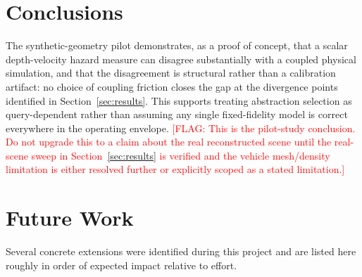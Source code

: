 \documentclass[conference]{IEEEtran}
\newcommand{\FLAG}[1]{\textcolor{red}{[FLAG: #1]}}
\begin{document}
\section{Conclusions}
\label{sec:conclusions}

The synthetic-geometry pilot demonstrates, as a proof of concept, that a scalar depth-velocity hazard measure can disagree substantially with a coupled physical simulation, and that the disagreement is structural rather than a calibration artifact: no choice of coupling friction closes the gap at the divergence points identified in Section~\ref{sec:results}. This supports treating abstraction selection as query-dependent rather than assuming any single fixed-fidelity model is correct everywhere in the operating envelope. \FLAG{This is the pilot-study conclusion. Do not upgrade this to a claim about the real reconstructed scene until the real-scene sweep in Section~\ref{sec:results} is verified and the vehicle mesh/density limitation is either resolved further or explicitly scoped as a stated limitation.}

\section{Future Work}
\label{sec:future}

Several concrete extensions were identified during this project and are listed here roughly in order of expected impact relative to effort.
\end{document}
